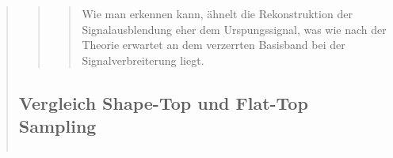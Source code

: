 \begin{quote}
\begin{quote}
\begin{quote}
             
             Wie man erkennen kann, ähnelt die Rekonstruktion der Signalausblendung eher dem Urspungssignal, was wie
             nach der Theorie erwartet an dem verzerrten Basisband bei der Signalverbreiterung liegt.
             
        \end{quote}
        
        
        
    \end{quote}
    
    \subsection{Vergleich Shape-Top und Flat-Top Sampling}
      \begin{quote}
      
      \begin{center}
            \begin{tabular}{ll}
            

\end{tabular}
\end{center}
\end{quote}
\end{quote}
